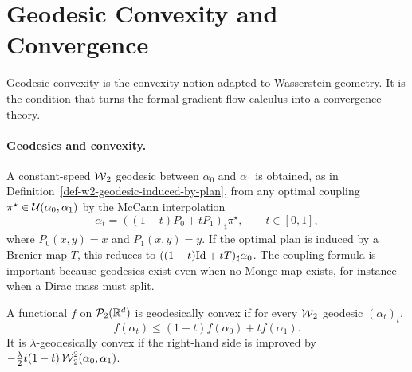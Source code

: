\section{Geodesic Convexity and Convergence}
\label{sec-geodesic-convexity}

Geodesic convexity is the convexity notion adapted to Wasserstein geometry. It is the condition that turns the formal gradient-flow calculus into a convergence theory.

\paragraph{Geodesics and convexity.}

A constant-speed $\operatorname{\mathcal{W}}_2$ geodesic between $\alpha_0$ and $\alpha_1$ is obtained, as in Definition~\ref{def-w2-geodesic-induced-by-plan}, from any optimal coupling $\pi^\star\in\mathcal{U}(\alpha_0,\alpha_1)$ by the McCann interpolation
\[
	\alpha_t=((1-t)P_0+tP_1)_\sharp\pi^\star,
	\qquad t\in[0,1],
\]
where $P_0(x,y)=x$ and $P_1(x,y)=y$. If the optimal plan is induced by a Brenier map $T$, this reduces to $((1-t)\mathrm{Id}+tT)_\sharp\alpha_0$. The coupling formula is important because geodesics exist even when no Monge map exists, for instance when a Dirac mass must split.

\begin{defn}\label{def-geodesic-convexity}
	A functional $f$ on $\mathcal{P}_2(\mathbb{R}^d)$ is geodesically convex if for every $\operatorname{\mathcal{W}}_2$ geodesic $(\alpha_t)_t$,
	\[
		f(\alpha_t)\leq (1-t)f(\alpha_0)+t f(\alpha_1).
	\]
	It is $\lambda$-geodesically convex if the right-hand side is improved by $-\frac{\lambda}{2}t(1-t)\operatorname{\mathcal{W}}_2^2(\alpha_0,\alpha_1)$.
\end{defn}

